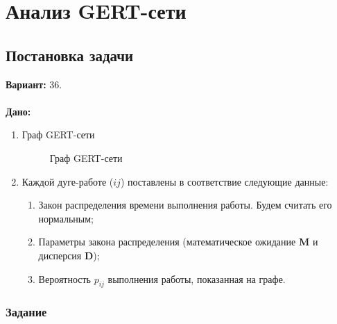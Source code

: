 



%
\setcounter{chapter}{3}
\chapter{Анализ GERT-сети}
\section{Постановка задачи}
\textbf{Вариант:} 36.\\\\
\textbf{Дано:}
\begin{enumerate}
\item Граф GERT-сети
\begin{figure}[H]
  \centering
  \caption{Граф GERT-сети}
\end{figure}
\item Каждой дуге-работе ($ij$) поставлены в соответствие следующие данные:
\begin{enumerate}
\item Закон распределения времени выполнения работы. Будем считать его нормальным;
\item Параметры закона распределения (математическое ожидание \textbf{M} и дисперсия \textbf{D});
\item Вероятность $p_{ij}$ выполнения работы, показанная на графе.
\end{enumerate}
\end{enumerate}


\subsection{Задание}
